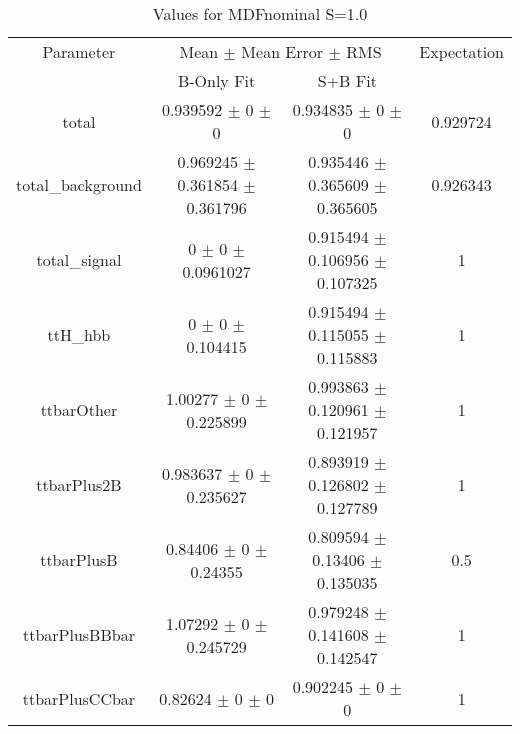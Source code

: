 \begin{table}
\centering
\caption{Values for MDFnominal S=1.0}
\begin{tabular}{cccc}
\toprule
Parameter & \multicolumn{2}{c}{Mean $\pm$ Mean Error $\pm$ RMS} & Expectation\\
 & B-Only Fit & S+B Fit & \\
\midrule
total & \num{0.939592} $\pm$ \num{0} $\pm$ \num{0} & \num{0.934835} $\pm$ \num{0} $\pm$ \num{0} & \num{0.929724}\\
total\_background & \num{0.969245} $\pm$ \num{0.361854} $\pm$ \num{0.361796} & \num{0.935446} $\pm$ \num{0.365609} $\pm$ \num{0.365605} & \num{0.926343}\\
total\_signal & \num{0} $\pm$ \num{0} $\pm$ \num{0.0961027} & \num{0.915494} $\pm$ \num{0.106956} $\pm$ \num{0.107325} & \num{1}\\
ttH\_hbb & \num{0} $\pm$ \num{0} $\pm$ \num{0.104415} & \num{0.915494} $\pm$ \num{0.115055} $\pm$ \num{0.115883} & \num{1}\\
ttbarOther & \num{1.00277} $\pm$ \num{0} $\pm$ \num{0.225899} & \num{0.993863} $\pm$ \num{0.120961} $\pm$ \num{0.121957} & \num{1}\\
ttbarPlus2B & \num{0.983637} $\pm$ \num{0} $\pm$ \num{0.235627} & \num{0.893919} $\pm$ \num{0.126802} $\pm$ \num{0.127789} & \num{1}\\
ttbarPlusB & \num{0.84406} $\pm$ \num{0} $\pm$ \num{0.24355} & \num{0.809594} $\pm$ \num{0.13406} $\pm$ \num{0.135035} & \num{0.5}\\
ttbarPlusBBbar & \num{1.07292} $\pm$ \num{0} $\pm$ \num{0.245729} & \num{0.979248} $\pm$ \num{0.141608} $\pm$ \num{0.142547} & \num{1}\\
ttbarPlusCCbar & \num{0.82624} $\pm$ \num{0} $\pm$ \num{0} & \num{0.902245} $\pm$ \num{0} $\pm$ \num{0} & \num{1}\\
\bottomrule
\end{tabular}
\end{table}